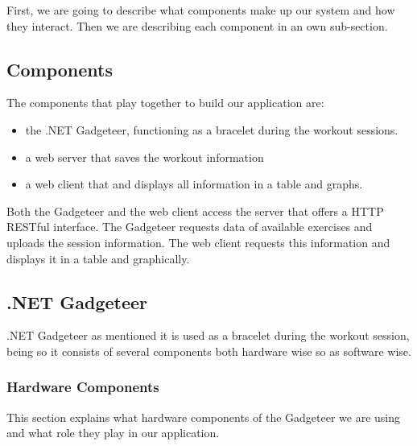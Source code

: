 \documentclass{tk3-team}
\begin{document}
First, we are going to describe what components make up our system and how they interact. Then we are describing each component in an own sub-section.

\subsection{Components}
The components that play together to build our application are:
\begin{itemize}
	\item the .NET Gadgeteer, functioning as a bracelet during the workout sessions.
	\item a web server that saves the workout information 
	\item  a web client that and displays all information in a table and graphs.
\end{itemize}

Both the Gadgeteer and the web client access the server that offers a HTTP RESTful interface. The Gadgeteer requests data of available exercises  and uploads the session information. The web client requests this information and displays it in a table and graphically.

\subsection{.NET Gadgeteer}
.NET Gadgeteer as mentioned it is used as a bracelet during the workout session, being so it consists of several components both hardware wise so as software wise. 

\subsubsection{Hardware Components}

This section explains what hardware components of the Gadgeteer we are using and what role they play in our application.
\end{document}
